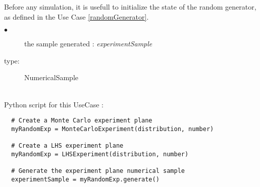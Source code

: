 Before any simulation, it is usefull to initialize the state of the random generator, as defined in the Use Case \ref{randomGenerator}.\\

{
  \begin{description}
  \item[$\bullet$] the sample generated : {\itshape experimentSample}
  \item[type:] NumericalSample
  \end{description}
}

\textspace\\
Python script for this UseCase :

\begin{lstlisting}
  # Create a Monte Carlo experiment plane
  myRandomExp = MonteCarloExperiment(distribution, number)

  # Create a LHS experiment plane
  myRandomExp = LHSExperiment(distribution, number)

  # Generate the experiment plane numerical sample
  experimentSample = myRandomExp.generate()
\end{lstlisting}

